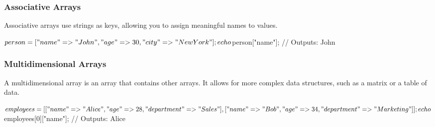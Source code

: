 \documentclass{report}
\begin{document}
\bigbreak \noindent 
\subsubsection{Associative Arrays}
\bigbreak \noindent 
Associative arrays use strings as keys, allowing you to assign meaningful names to values.
\bigbreak \noindent 
\begin{phpcode}
$person = [
    "name" => "John",
    "age" => 30,
    "city" => "New York"
];
echo $person["name"];  // Outputs: John
\end{phpcode}

\bigbreak \noindent 
\subsubsection{Multidimensional Arrays}
\bigbreak \noindent 
A multidimensional array is an array that contains other arrays. It allows for more complex data structures, such as a matrix or a table of data.
\bigbreak \noindent 
\begin{phpcode}
$employees = [
    ["name" => "Alice", "age" => 28, "department" => "Sales"],
    ["name" => "Bob", "age" => 34, "department" => "Marketing"]
];
echo $employees[0]["name"];  // Outputs: Alice
\end{phpcode}

\bigbreak \noindent 
\end{document}
